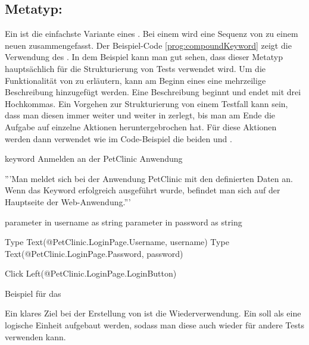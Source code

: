 \subsection{Metatyp: }

Ein  ist die einfachste Variante eines . Bei einem  wird eine Sequenz von  zu einem neuen  zusammengefasst. Der Beispiel-Code \ref{prog:compoundKeyword} zeigt die Verwendung des  . In dem Beispiel kann man gut sehen, dass dieser Metatyp hauptsächlich für die Strukturierung von Tests verwendet wird. Um die Funktionalität von  zu erläutern, kann am Beginn eines  eine mehrzeilige Beschreibung hinzugefügt werden. Eine Beschreibung beginnt und endet mit drei Hochkommas. Ein Vorgehen zur Strukturierung von einem Testfall kann sein, dass man diesen immer weiter und weiter in  zerlegt, bis man am Ende die Aufgabe auf einzelne Aktionen heruntergebrochen hat. Für diese Aktionen werden dann  verwendet wie im Code-Beispiel die beiden   und .

\begin{program}
\begin{JavaCode}
keyword Anmelden an der PetClinic Anwendung {
	'''Man meldet sich bei der Anwendung PetClinic mit den definierten 
	   Daten an. Wenn das Keyword erfolgreich ausgeführt wurde, 
	   befindet man sich auf der Hauptseite der Web-Anwendung.'''
	
	parameter in username as string
	parameter in password as string
	
	Type Text(@PetClinic.LoginPage.Username, username)
	Type Text(@PetClinic.LoginPage.Password, password)
	
	Click Left(@PetClinic.LoginPage.LoginButton)
}
\end{JavaCode}
\caption{Beispiel für das  }
\label{prog:compoundKeyword}
\end{program}

\SuperPar
Ein klares Ziel bei der Erstellung von  ist die Wiederverwendung. Ein  soll als eine logische Einheit aufgebaut werden, sodass man diese auch wieder für andere Tests verwenden kann. 


